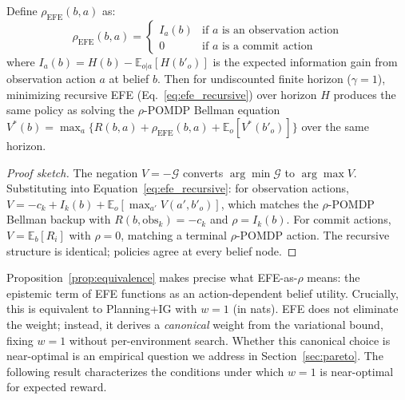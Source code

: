\documentclass[runningheads]{llncs}
\begin{document}
\begin{proposition}
\label{prop:equivalence}
Define $\rho_{\mathrm{EFE}}(b, a)$ as:
\begin{equation*}
    \rho_{\mathrm{EFE}}(b, a) = \begin{cases} I_a(b) & \text{if } a \text{ is an observation action} \\ 0 & \text{if } a \text{ is a commit action} \end{cases}
\end{equation*}
where $I_a(b) = H(b) - \mathbb{E}_{o|a}[H(b'_o)]$ is the expected information gain from observation action $a$ at belief $b$. Then for undiscounted finite horizon ($\gamma{=}1$), minimizing recursive EFE (Eq.~\ref{eq:efe_recursive}) over horizon $H$ produces the same policy as solving the $\rho$-POMDP Bellman equation $V^*(b) = \max_a \{R(b,a) + \rho_{\mathrm{EFE}}(b,a) + \mathbb{E}_o[V^*(b'_o)]\}$ over the same horizon.
\end{proposition}
\begin{proof}[Proof sketch]
The negation $V = -\mathcal{G}$ converts $\arg\min \mathcal{G}$ to $\arg\max V$. Substituting into Equation~\ref{eq:efe_recursive}: for observation actions, $V = -c_k + I_k(b) + \mathbb{E}_o[\max_{a'} V(a', b'_o)]$, which matches the $\rho$-POMDP Bellman backup with $R(b, \text{obs}_k) = -c_k$ and $\rho = I_k(b)$. For commit actions, $V = \mathbb{E}_b[R_i]$ with $\rho = 0$, matching a terminal $\rho$-POMDP action. The recursive structure is identical; policies agree at every belief node.
\end{proof}

Proposition~\ref{prop:equivalence} makes precise what EFE-as-$\rho$ means: the epistemic term of EFE functions as an action-dependent belief utility. Crucially, this is equivalent to Planning+IG with $w{=}1$ (in nats). EFE does not eliminate the weight; instead, it derives a \emph{canonical} weight from the variational bound, fixing $w{=}1$ without per-environment search. Whether this canonical choice is near-optimal is an empirical question we address in Section~\ref{sec:pareto}. The following result characterizes the conditions under which $w{=}1$ is near-optimal for expected reward.
\end{document}
